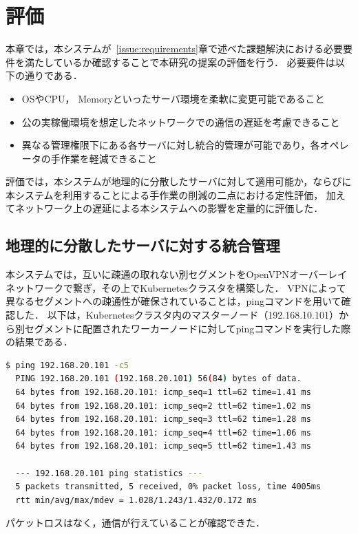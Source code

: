 \chapter{評価}
\label{evaluation}

本章では，本システムが~\ref{issue:requirements}章で述べた課題解決における必要要件を満たしているか確認することで本研究の提案の評価を行う．
必要要件は以下の通りである．
\begin{itemize}
  \item OSやCPU， Memoryといったサーバ環境を柔軟に変更可能であること
  \item 公の実稼働環境を想定したネットワークでの通信の遅延を考慮できること
  \item 異なる管理権限下にある各サーバに対し統合的管理が可能であり，各オペレータの手作業を軽減できること
\end{itemize}
評価では，本システムが地理的に分散したサーバに対して適用可能か，ならびに本システムを利用することによる手作業の削減の二点における定性評価，
加えてネットワーク上の遅延による本システムへの影響を定量的に評価した．

\section{地理的に分散したサーバに対する統合管理}

本システムでは，互いに疎通の取れない別セグメントをOpenVPNオーバーレイネットワークで繋ぎ，その上でKubernetesクラスタを構築した．
VPNによって異なるセグメントへの疎通性が確保されていることは，pingコマンドを用いて確認した．
以下は，Kubernetesクラスタ内のマスターノード（192.168.10.101）から別セグメントに配置されたワーカーノードに対してpingコマンドを実行した際の結果である．

\begin{lstlisting}[language=bash]
  $ ping 192.168.20.101 -c5
  PING 192.168.20.101 (192.168.20.101) 56(84) bytes of data.
  64 bytes from 192.168.20.101: icmp_seq=1 ttl=62 time=1.41 ms
  64 bytes from 192.168.20.101: icmp_seq=2 ttl=62 time=1.02 ms
  64 bytes from 192.168.20.101: icmp_seq=3 ttl=62 time=1.28 ms
  64 bytes from 192.168.20.101: icmp_seq=4 ttl=62 time=1.06 ms
  64 bytes from 192.168.20.101: icmp_seq=5 ttl=62 time=1.43 ms

  --- 192.168.20.101 ping statistics ---
  5 packets transmitted, 5 received, 0% packet loss, time 4005ms
  rtt min/avg/max/mdev = 1.028/1.243/1.432/0.172 ms
\end{lstlisting}

パケットロスはなく，通信が行えていることが確認できた．

